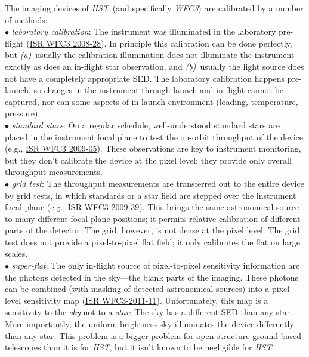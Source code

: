 \documentclass[12pt]{article}
\newcommand{\project}[1]{\textsl{#1}}
\newcommand{\HST}{\project{HST}}
\newcommand{\WFC}{\project{WFC3}}
\begin{document}
The imaging devices of \HST\ (and specifically \WFC) are calibrated by a number of
methods:
\\ $\bullet$ \project{laboratory calibration}: The instrument was illuminated
  in the laboratory pre-flight (\href{http://bit.ly/Xn8OOH}{ISR WFC3
    2008-28}).  In principle this calibration can be
  done perfectly, but \textsl{(a)}~usually the calibration
  illumination does not illuminate the instrument exactly as does an
  in-flight star observation, and \textsl{(b)}~usually the light
  source does not have a completely appropriate SED.  The laboratory
  calibration happens pre-launch, so changes in the instrument through
  launch and in flight cannot be captured, nor can some aspects of in-launch
  environment (loading, temperature, pressure).
\\ $\bullet$ \project{standard stars}: On a regular schedule, well-understood
  standard stars are placed in the instrument focal plane to test the
  on-orbit throughput of the device (e.g.,
  \href{http://bit.ly/Y7wx5v}{ISR WFC3 2009-05}).  These
  observations are key to instrument monitoring, but they don't
  calibrate the device at the pixel level; they provide only overall
  throughput measurements.
\\ $\bullet$ \project{grid test}: The throughput measurements are transferred
  out to the entire device by grid tests, in which standards or a star
  field are stepped over the instrument focal plane (e.g., \href{http://bit.ly/XFdEYW}{ISR WFC3
  2009-39}).  This brings the same astronomical source to many
  different focal-plane positions; it permits relative calibration of
  different parts of the detector. The grid, however, is not dense at
  the pixel level.  The grid test does not provide a pixel-to-pixel
  flat field; it only calibrates the flat on large scales.
\\ $\bullet$ \project{super-flat}: The only in-flight source of
  pixel-to-pixel sensitivity information are the photons detected in
  the sky---the blank parts of the imaging.  These photons can be
  combined (with masking of detected astronomical sources) into a
  pixel-level sensitivity map (\href{http://bit.ly/YJJB2m}{ISR
    WFC3-2011-11}).  Unfortunately, this
  map is a sensitivity to the \emph{sky} not to a \emph{star}: The sky
  has a different SED than any star.  More importantly, the
  uniform-brightness sky illuminates the device differently than any
  star.  This problem is a bigger problem for open-structure
  ground-based telescopes than it is for \HST, but it isn't known to
  be negligible for \HST.  
\end{document}
